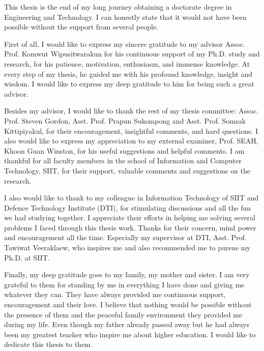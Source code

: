 %

This thesis is the end of my long journey obtaining a doctorate degree in Engineering and Technology. 
I can honestly state that it would not have been possible without the support from several people.

First of all, I would like to express my sincere gratitude to my advisor Assoc. Prof. Komwut Wipusitwarakun for his continuous support of my Ph.D. study and research, for his patience, motivation, enthusiasm, and immense knowledge.
At every step of my thesis, he guided me with his profound knowledge, insight and wisdom.
I would like to express my deep gratitude to him for being such a great advisor. 

Besides my advisor, I would like to thank the rest of my thesis committee: Assoc. Prof. Steven Gordon, Asst. Prof. Prapun Sukompong and Asst. Prof. Somsak Kittipiyakul, for their encouragement, insightful comments, and hard questions. I also would like to express my appreciation to my external examiner, Prof. SEAH, Khoon Guan Winston, for his useful suggestions and helpful comments. 
I am thankful for all faculty members in the school of Information and Computer Technology, SIIT, for their support, valuable comments and suggestions on the research.

I also would like to thank to my colleague in Information Technology of SIIT and Defence Technology Institute (DTI), for stimulating discussions and all the fun we had studying together. 
I appreciate their efforts in helping me solving several problems I faced through this thesis work.
Thanks for their concern, mind power and encouragement all the time.
Especially my supervisor at DTI, Asst. Prof. Tawiwat Veeraklaew, who inspires me and also recommended me to pursue my Ph.D. at SIIT.

Finally, my deep gratitude goes to my family, my mother and sister.
I am very grateful to them for standing by me in everything I have done and giving me whatever they can.
They have always provided me continuous support, encouragement and their love.
I believe that nothing would be possible without the presence of them and the peaceful family environment they provided me during my life.
Even though my father already passed away but he had always been my greatest teacher who inspire me about higher education. 
I would like to dedicate this thesis to them.